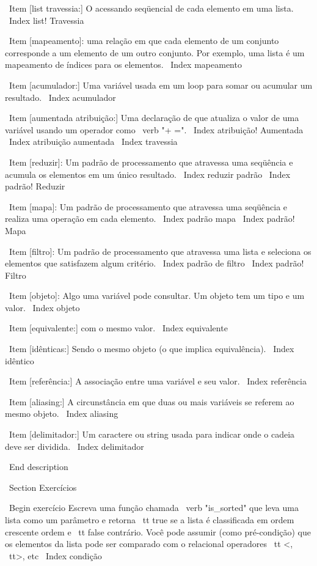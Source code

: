 \documentclass[10pt]{book}
\begin{document}
\begin {itemize}
{{{{{{{\ Item [list travessia:] O acessando seqüencial de cada elemento em uma lista.
\ Index {list! Travessia}

\ Item [mapeamento]: uma relação em que cada elemento de um conjunto
corresponde a um elemento de um outro conjunto. Por exemplo, uma lista é
um mapeamento de índices para os elementos.
\ Index {mapeamento}

\ Item [acumulador:] Uma variável usada em um loop para somar ou
acumular um resultado.
\ Index {acumulador}

\ Item [aumentada atribuição:] Uma declaração de que atualiza o valor
de uma variável usando um operador como \ verb "+ =".
\ Index {atribuição! Aumentada}
\ Index {atribuição aumentada}
\ Index {travessia}

\ Item [reduzir]: Um padrão de processamento que atravessa uma seqüência 
e acumula os elementos em um único resultado.
\ Index {reduzir padrão}
\ Index {padrão! Reduzir}

\ Item [mapa]: Um padrão de processamento que atravessa uma seqüência e
realiza uma operação em cada elemento.
\ Index {padrão mapa}
\ Index {padrão! Mapa}

\ Item [filtro]: Um padrão de processamento que atravessa uma lista e
seleciona os elementos que satisfazem algum critério.
\ Index {padrão de filtro}
\ Index {padrão! Filtro}

\ Item [objeto]: Algo uma variável pode consultar. Um objeto
tem um tipo e um valor.
\ Index {objeto}

\ Item [equivalente:] com o mesmo valor.
\ Index {equivalente}

\ Item [idênticas:] Sendo o mesmo objeto (o que implica equivalência).
\ Index {idêntico}

\ Item [referência:] A associação entre uma variável e seu valor.
\ Index {referência}

\ Item [aliasing:] A circunstância em que duas ou mais variáveis ​​se referem ao mesmo
objeto.
\ Index {aliasing}

\ Item [delimitador:] Um caractere ou string usada para indicar onde o
cadeia deve ser dividida.
\ Index {delimitador}

\ End {description}


\ Section {Exercícios}

\ Begin {} exercício
Escreva uma função chamada \ verb "is_sorted" que leva uma lista como um
parâmetro e retorna {\ tt true} se a lista é classificada em ordem crescente
ordem e {\ tt false} contrário. Você pode assumir (como pré-condição)
que os elementos da lista pode ser comparado com o relacional
operadores {\ tt <}, {\ tt>}, etc
\ Index {condição}

}}}}}}}
\end{itemize}
\end{document}
